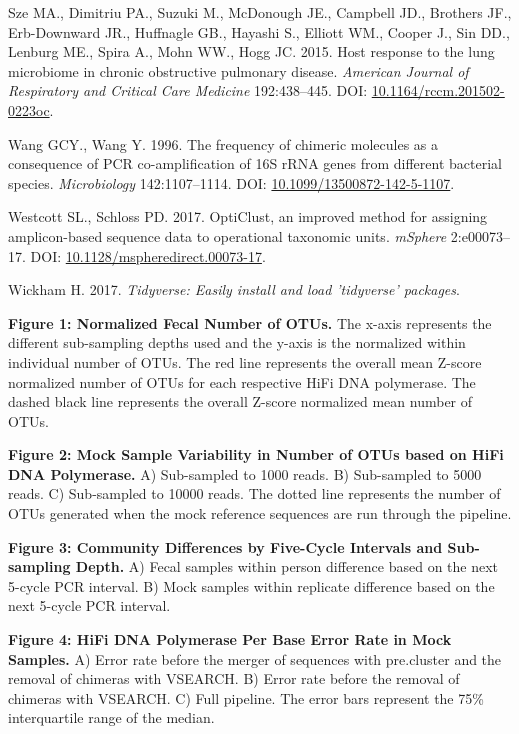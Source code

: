 \documentclass[12pt,]{article}
\begin{document}
\hypertarget{ref-Sze2015}{}
Sze MA., Dimitriu PA., Suzuki M., McDonough JE., Campbell JD., Brothers
JF., Erb-Downward JR., Huffnagle GB., Hayashi S., Elliott WM., Cooper
J., Sin DD., Lenburg ME., Spira A., Mohn WW., Hogg JC. 2015. Host
response to the lung microbiome in chronic obstructive pulmonary
disease. \emph{American Journal of Respiratory and Critical Care
Medicine} 192:438--445. DOI:
\href{https://doi.org/10.1164/rccm.201502-0223oc}{10.1164/rccm.201502-0223oc}.

\hypertarget{ref-Wang1996}{}
Wang GCY., Wang Y. 1996. The frequency of chimeric molecules as a
consequence of PCR co-amplification of 16S rRNA genes from different
bacterial species. \emph{Microbiology} 142:1107--1114. DOI:
\href{https://doi.org/10.1099/13500872-142-5-1107}{10.1099/13500872-142-5-1107}.

\hypertarget{ref-opticlust_Westcott_2017}{}
Westcott SL., Schloss PD. 2017. OptiClust, an improved method for
assigning amplicon-based sequence data to operational taxonomic units.
\emph{mSphere} 2:e00073--17. DOI:
\href{https://doi.org/10.1128/mspheredirect.00073-17}{10.1128/mspheredirect.00073-17}.

\hypertarget{ref-tidyverse_2017}{}
Wickham H. 2017. \emph{Tidyverse: Easily install and load 'tidyverse'
packages}.

\newpage

\textbf{Figure 1: Normalized Fecal Number of OTUs.} The x-axis
represents the different sub-sampling depths used and the y-axis is the
normalized within individual number of OTUs. The red line represents the
overall mean Z-score normalized number of OTUs for each respective HiFi
DNA polymerase. The dashed black line represents the overall Z-score
normalized mean number of OTUs.

\textbf{Figure 2: Mock Sample Variability in Number of OTUs based on
HiFi DNA Polymerase.} A) Sub-sampled to 1000 reads. B) Sub-sampled to
5000 reads. C) Sub-sampled to 10000 reads. The dotted line represents
the number of OTUs generated when the mock reference sequences are run
through the pipeline.

\textbf{Figure 3: Community Differences by Five-Cycle Intervals and
Sub-sampling Depth.} A) Fecal samples within person difference based on
the next 5-cycle PCR interval. B) Mock samples within replicate
difference based on the next 5-cycle PCR interval.

\textbf{Figure 4: HiFi DNA Polymerase Per Base Error Rate in Mock
Samples.} A) Error rate before the merger of sequences with pre.cluster
and the removal of chimeras with VSEARCH. B) Error rate before the
removal of chimeras with VSEARCH. C) Full pipeline. The error bars
represent the 75\% interquartile range of the median.
\end{document}

